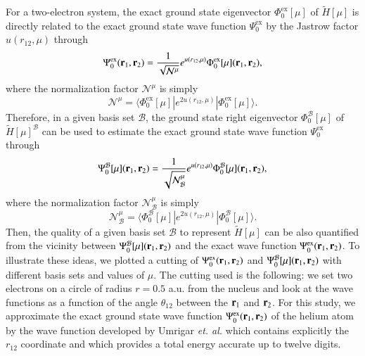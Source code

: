 \documentclass[aip,jcp,reprint,noshowkeys,superscriptaddress,twocolumn]{revtex4-1}
\newcommand{\matelem}[3]{\langle #1 | #2 | #3 \rangle}
\newcommand{\br}[0]{{\bf {r}}}
\newcommand{\bri}[1]{{\bf r}_{#1}}
\newcommand{\psiex}[0]{\Psi^{\text{ex}}_0}
\newcommand{\phimu}[0]{\Phi^{\text{ex}}_0[\mu]}
\newcommand{\phimub}[0]{\Phi^{\mathcal{B}}_0[\mu]}
\newcommand{\psimub}[0]{\Psi^{\mathcal{B}}_0[\mu]}
\newcommand{\basis}[0]{\mathcal{B}}
\begin{document}
For a two-electron system, the exact ground state eigenvector $\phimu$ of $\tilde{H}[\mu]$ is directly related to the exact ground state wave function $\psiex$ by the Jastrow factor $u(r_{12},\mu)$ through 
\begin{equation}
 \psiex(\br{}_1,\br{}_2) =  \frac{1}{\sqrt{\mathcal{N}^{\mu}}} e^{u(r_{12},\mu)} \phimu(\br{}_1,\br{}_2), 
\end{equation}
where the normalization factor $\mathcal{N}^{\mu}$ is simply 
\begin{equation}
  \mathcal{N}^{\mu} = \matelem{\phimu}{e^{2 u(r_{12},\mu)}}{\phimu}.
\end{equation}
Therefore, in a given basis set $\basis$, the ground state right eigenvector $\phimub$ of $\tilde{H}[\mu]^{\basis}$ can be used to estimate the exact ground state wave function $\psiex$ through 
\begin{equation}
 \psimub(\br{}_1,\br{}_2) = \frac{1}{\sqrt{\mathcal{N}_{\basis}^{\mu}}}e^{u(r_{12},\mu)}\phimub(\br{}_1,\br{}_2),
\end{equation}
where the normalization factor $\mathcal{N}_{\basis}^{\mu}$ is simply
\begin{equation}
  \mathcal{N}_{\basis}^{\mu} = \matelem{\phimub}{e^{2 u(r_{12},\mu)}}{\phimub}.
\end{equation}
Then, the quality of a given basis set $\basis$ to represent $\tilde{H}[\mu]$  can be also quantified from the vicinity between $\psimub(\br{}_1,\br{}_2)$ and the exact wave function $\psiex(\br{}_1,\br{}_2)$. 
To illustrate these ideas, 
we plotted a cutting of $\psiex(\br{}_1,\br{}_2)$ and  $\psimub(\br{}_1,\br{}_2) $ with different basis sets and values of $\mu$. The cutting used is the following: we set two electrons on a circle of radius $r=0.5$ a.u. from the nucleus and look at the wave functions as a function of the angle $\theta_{12}$ between the $\bri{1}$ and $\bri{2}$. 
For this study, we approximate the exact ground state wave function $\psiex(\br{}_1,\br{}_2)$ of the helium atom by the wave function developed by Umrigar \textit{et. al.}\cite{UmrGon-PRA-94} which contains explicitly the $r_{12}$ coordinate and which provides a total energy accurate up to twelve digits.  
\end{document}
